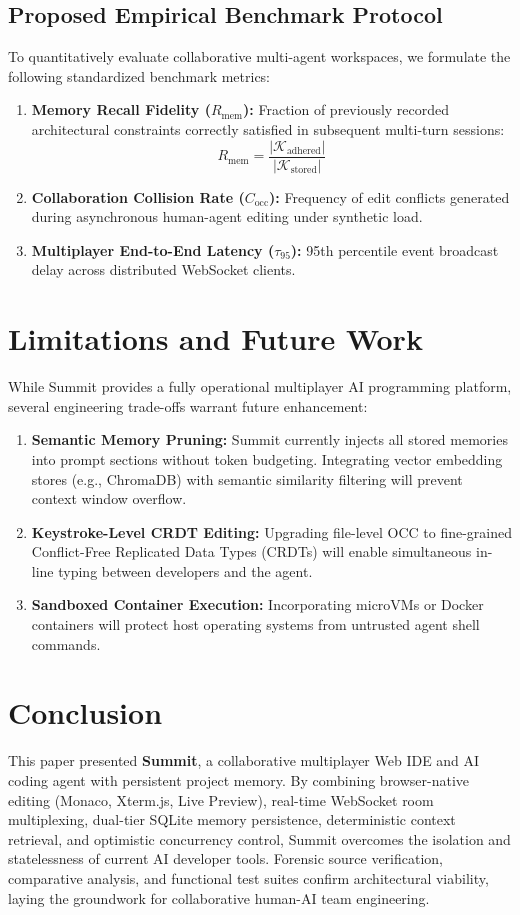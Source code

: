 \documentclass[conference]{IEEEtran}
\begin{document}
\subsection{Proposed Empirical Benchmark Protocol}
To quantitatively evaluate collaborative multi-agent workspaces, we formulate the following standardized benchmark metrics:
\begin{enumerate}
    \item \textbf{Memory Recall Fidelity ($R_{\text{mem}}$):} Fraction of previously recorded architectural constraints correctly satisfied in subsequent multi-turn sessions:
    \begin{equation}
    R_{\text{mem}} = \frac{|\mathcal{K}_{\text{adhered}}|}{|\mathcal{K}_{\text{stored}}|}
    \end{equation}
    \item \textbf{Collaboration Collision Rate ($C_{\text{occ}}$):} Frequency of edit conflicts generated during asynchronous human-agent editing under synthetic load.
    \item \textbf{Multiplayer End-to-End Latency ($\tau_{95}$):} 95th percentile event broadcast delay across distributed WebSocket clients.
\end{enumerate}

\section{Limitations and Future Work}
While Summit provides a fully operational multiplayer AI programming platform, several engineering trade-offs warrant future enhancement:
\begin{enumerate}
    \item \textbf{Semantic Memory Pruning:} Summit currently injects all stored memories into prompt sections without token budgeting. Integrating vector embedding stores (e.g., ChromaDB) with semantic similarity filtering will prevent context window overflow.
    \item \textbf{Keystroke-Level CRDT Editing:} Upgrading file-level OCC to fine-grained Conflict-Free Replicated Data Types (CRDTs) will enable simultaneous in-line typing between developers and the agent.
    \item \textbf{Sandboxed Container Execution:} Incorporating microVMs or Docker containers will protect host operating systems from untrusted agent shell commands.
\end{enumerate}

\section{Conclusion}
This paper presented \textbf{Summit}, a collaborative multiplayer Web IDE and AI coding agent with persistent project memory. By combining browser-native editing (Monaco, Xterm.js, Live Preview), real-time WebSocket room multiplexing, dual-tier SQLite memory persistence, deterministic context retrieval, and optimistic concurrency control, Summit overcomes the isolation and statelessness of current AI developer tools. Forensic source verification, comparative analysis, and functional test suites confirm architectural viability, laying the groundwork for collaborative human-AI team engineering.



\end{document}
